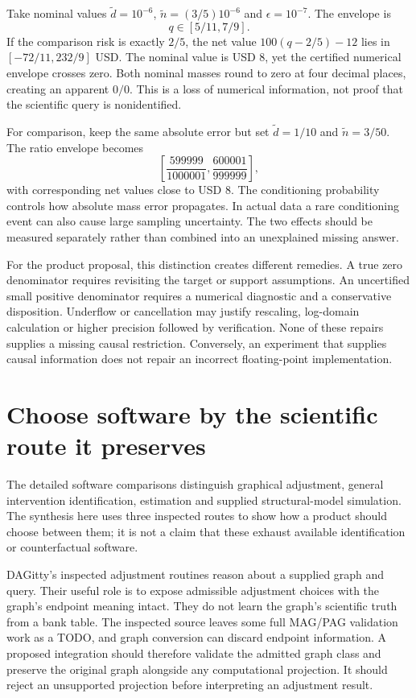 Take nominal values
$\widetilde d=10^{-6}$,
$\widetilde n=(3/5)10^{-6}$ and $\epsilon=10^{-7}$.
The envelope is
\[
 q\in[5/11,7/9].
\]
If the comparison risk is exactly $2/5$, the net value
$100(q-2/5)-12$ lies in
$[-72/11,232/9]$ USD. The nominal value is USD 8,
yet the certified numerical envelope crosses zero.
Both nominal masses round to zero at four decimal
places, creating an apparent $0/0$. This is a loss
of numerical information, not proof that the
scientific query is nonidentified.\citep{exec17_s3_exact}

For comparison, keep the same absolute error but set
$\widetilde d=1/10$ and
$\widetilde n=3/50$. The ratio envelope becomes
\[
 \left[\frac{599999}{1000001},
       \frac{600001}{999999}\right],
\]
with corresponding net values close to USD 8.
The conditioning probability controls how absolute mass
error propagates. In actual data a rare conditioning
event can also cause large sampling uncertainty. The
two effects should be measured separately rather than
combined into an unexplained missing answer.

For the product proposal, this distinction creates
different remedies. A true zero denominator requires
revisiting the target or support assumptions. An
uncertified small positive denominator requires a
numerical diagnostic and a conservative disposition.
Underflow or cancellation may justify rescaling,
log-domain calculation or higher precision followed
by verification. None of these repairs supplies a
missing causal restriction. Conversely, an experiment
that supplies causal information does not repair an
incorrect floating-point implementation.

\section{Choose software by the scientific route it preserves}
\label{exec17:s3-software}

The detailed software comparisons distinguish graphical
adjustment, general intervention identification,
estimation and supplied structural-model simulation.
The synthesis here uses three inspected routes to show
how a product should choose between them; it is not a
claim that these exhaust available identification or
counterfactual software.

DAGitty's inspected adjustment routines reason about a
supplied graph and query. Their useful role is to expose
admissible adjustment choices with the graph's endpoint
meaning intact. They do not learn the graph's scientific
truth from a bank table. The inspected source leaves
some full MAG/PAG validation work as a TODO, and graph
conversion can discard endpoint information. A proposed
integration should therefore validate the admitted
graph class and preserve the original graph alongside
any computational projection. It should reject an
unsupported projection before interpreting an adjustment
result.\citep{exec13_other_dagitty,exec14_olatent_dagitty}

